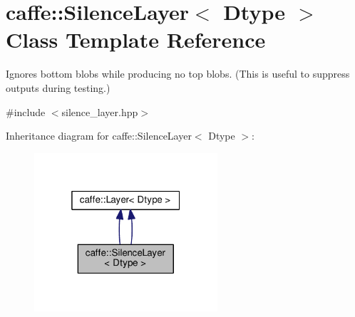 \hypertarget{classcaffe_1_1_silence_layer}{}\section{caffe\+:\+:Silence\+Layer$<$ Dtype $>$ Class Template Reference}
\label{classcaffe_1_1_silence_layer}


Ignores bottom blobs while producing no top blobs. (This is useful to suppress outputs during testing.)  




{\ttfamily \#include $<$silence\+\_\+layer.\+hpp$>$}



Inheritance diagram for caffe\+:\+:Silence\+Layer$<$ Dtype $>$\+:
\nopagebreak
\begin{figure}[H]
\begin{center}
\leavevmode
\includegraphics[width=193pt]{classcaffe_1_1_silence_layer__inherit__graph}
\end{center}
\end{figure}
